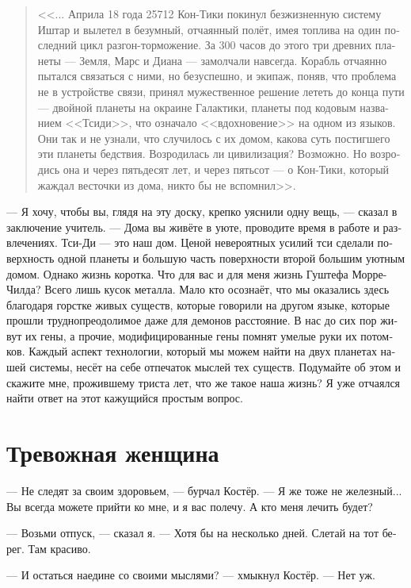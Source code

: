 \documentclass[a4paper,12pt,fleqn]{book}\usepackage{cooltooltips}\usepackage{polyglossia}\setdefaultlanguage[babelshorthands=true]{russian}\setotherlanguage{english}\defaultfontfeatures{Ligatures=TeX,Mapping=tex-text} \usepackage{xcolor}\definecolor{lightgray}{HTML}{bbbbbb}\color{lightgray}\newcommand{\ml}[3]{\textenglish{\textcolor{black}{#3}}}
\begin{document}
{\begin{quote}
<<... Априла 18 года 25712 Кон-Тики покинул безжизненную систему Иштар и вылетел в безумный, отчаянный полёт, имея топлива на один последний цикл разгон-торможение.
За 300 часов до этого три древних планеты --- Земля, Марс и Диана --- замолчали навсегда.
Корабль отчаянно пытался связаться с ними, но безуспешно, и экипаж, поняв, что проблема не в устройстве связи, принял мужественное решение лететь до конца пути --- двойной планеты на окраине Галактики, планеты под кодовым названием <<Тсиди>>, что означало <<вдохновение>> на одном из языков.
Они так и не узнали, что случилось с их домом, какова суть постигшего эти планеты бедствия.
Возродилась ли цивилизация?
Возможно.
Но возродись она и через пятьдесят лет, и через пятьсот --- о Кон-Тики, который жаждал весточки из дома, никто бы не вспомнил>>.
\end{quote}

--- Я хочу, чтобы вы, глядя на эту доску, крепко уяснили одну вещь, --- сказал в заключение учитель.
--- Дома вы живёте в уюте, проводите время в работе и развлечениях.
Тси-Ди --- это наш дом.
Ценой невероятных усилий тси сделали поверхность одной планеты и большую часть поверхности второй большим уютным домом.
Однако жизнь коротка.
Что для вас и для меня жизнь Гуштефа Морре-Чилда?
Всего лишь кусок металла.
Мало кто осознаёт, что мы оказались здесь благодаря горстке живых существ, которые говорили на другом языке, которые прошли труднопреодолимое даже для демонов расстояние.
В нас до сих пор живут их гены, а прочие, модифицированные гены помнят умелые руки их потомков.
Каждый аспект технологии, который мы можем найти на двух планетах нашей системы, несёт на себе отпечаток мыслей тех существ.
Подумайте об этом и скажите мне, прожившему триста лет, что же такое наша жизнь?
Я уже отчаялся найти ответ на этот кажущийся простым вопрос.

\section{Тревожная женщина}

--- Не следят за своим здоровьем, --- бурчал Костёр.
--- Я же тоже не железный...
Вы всегда можете прийти ко мне, и я вас полечу.
А кто меня лечить будет?

--- Возьми отпуск, --- сказал я.
--- Хотя бы на несколько дней.
Слетай на тот берег.
Там красиво.

--- И остаться наедине со своими мыслями? --- хмыкнул Костёр.
--- Нет уж.

}
\end{document}
